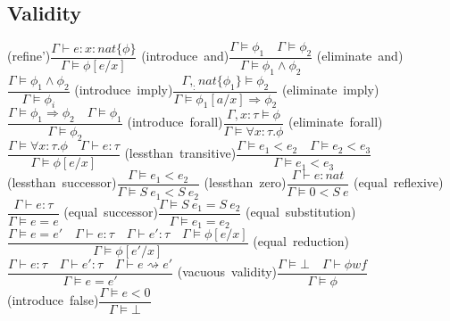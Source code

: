 \documentclass[12pt,a4paper,titlepage]{article}
\newcommand{\ts}{\vdash}
\newcommand{\dts}{\vDash}
\newcommand{\tj}[3]{\mbox{(#1)$\dfrac{#2}{#3}$}\quad}
\begin{document}
\begin{spacing}{2.5}
        \subsection{Validity}
        \begin{center}
            \tj{refine'}{
                \Gamma \ts e : x : nat \{\phi\}
            }{
                \Gamma \dts \phi [ e / x ]
            }
            \tj{introduce and}{
                \Gamma \dts \phi_1 \quad \Gamma \dts \phi_2
            }{
                \Gamma \dts \phi_1 \land \phi_2
            }
            \tj{eliminate and}{
                \Gamma \dts \phi_1 \land \phi_2
            }{
                \Gamma \dts \phi_i
            }
            \tj{introduce imply}{
                \Gamma , _:nat\{\phi_1\} \dts \phi_2
            }{
                \Gamma \dts \phi_1 [ a / x ] \Rightarrow \phi_2
            }
            \tj{eliminate imply}{
                \Gamma \dts \phi_1 \Rightarrow \phi_2 \quad \Gamma \dts \phi_1
            }{
                \Gamma \dts \phi_2
            }
            \tj{introduce forall}{
                \Gamma , x : \tau \dts \phi
            }{
                \Gamma \dts \forall x:\tau . \phi
            }
            \tj{eliminate forall}{
                \Gamma \dts \forall x : \tau . \phi \quad \Gamma \ts e : \tau
            }{
                \Gamma \dts \phi [ e / x ]
            }
            \tj{lessthan transitive}{
                \Gamma \dts e_1 < e_2 \quad \Gamma \dts e_2 < e_3
            }{
                \Gamma \dts e_1 < e_3
            }
            \tj{lessthan successor}{
                \Gamma \dts e_1 < e_2
            }{
                \Gamma \dts S\ e_1 < S\ e_2
            }
            \tj{lessthan zero}{
                \Gamma \ts e : nat
            }{
                \Gamma \dts 0 < S\ e
            }
            \tj{equal reflexive}{
                \Gamma \ts e: \tau
            }{
                \Gamma \dts e = e
            }
            \tj{equal successor}{
                \Gamma \dts S\ e_1 = S\ e_2
            }{
                \Gamma \dts e_1 = e_2
            }
            \tj{equal substitution}{
                \Gamma \dts e = e' \quad \Gamma \ts e:\tau \quad \Gamma \ts e':\tau \quad \Gamma \dts \phi [e / x]
            }{
                \Gamma \dts \phi [e' / x]
            }
            \tj{equal reduction}{
                \Gamma \ts e : \tau \quad \Gamma \ts e' : \tau \quad \Gamma \ts e \rightsquigarrow e'
            }{
                \Gamma \dts e = e'
            }
            \tj{vacuous validity}{
                \Gamma \dts \bot \quad \Gamma \ts \phi wf
            }{
                \Gamma \dts \phi
            }
            \tj{introduce false}{
                \Gamma \dts e < 0
            }{
                \Gamma \dts \bot
            }
        \end{center}

\end{spacing}
\end{document}
